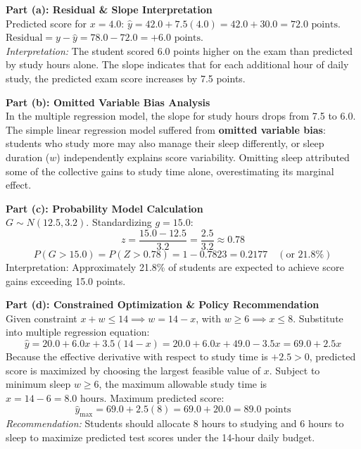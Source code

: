 \begin{frqrubricbox}
\textbf{Part (a): Residual \& Slope Interpretation}\\
Predicted score for $x = 4.0$: $\hat{y} = 42.0 + 7.5(4.0) = 42.0 + 30.0 = 72.0\text{ points}$.\\
$\text{Residual} = y - \hat{y} = 78.0 - 72.0 = +6.0\text{ points}$.\\
\textit{Interpretation:} The student scored 6.0 points higher on the exam than predicted by study hours alone. The slope indicates that for each additional hour of daily study, the predicted exam score increases by 7.5 points.

\textbf{Part (b): Omitted Variable Bias Analysis}\\
In the multiple regression model, the slope for study hours drops from 7.5 to 6.0. The simple linear regression model suffered from \textbf{omitted variable bias}: students who study more may also manage their sleep differently, or sleep duration ($w$) independently explains score variability. Omitting sleep attributed some of the collective gains to study time alone, overestimating its marginal effect.

\textbf{Part (c): Probability Model Calculation}\\
$G \sim N(12.5, 3.2)$. Standardizing $g = 15.0$:
\[ z = \frac{15.0 - 12.5}{3.2} = \frac{2.5}{3.2} \approx 0.78 \]
\[ P(G > 15.0) = P(Z > 0.78) = 1 - 0.7823 = 0.2177 \quad (\text{or } 21.8\%) \]
Interpretation: Approximately 21.8\% of students are expected to achieve score gains exceeding 15.0 points.

\textbf{Part (d): Constrained Optimization \& Policy Recommendation}\\
Given constraint $x + w \le 14 \implies w = 14 - x$, with $w \ge 6 \implies x \le 8$.
Substitute into multiple regression equation:
\[ \hat{y} = 20.0 + 6.0x + 3.5(14 - x) = 20.0 + 6.0x + 49.0 - 3.5x = 69.0 + 2.5x \]
Because the effective derivative with respect to study time is $+2.5 > 0$, predicted score is maximized by choosing the largest feasible value of $x$. Subject to minimum sleep $w \ge 6$, the maximum allowable study time is $x = 14 - 6 = 8.0\text{ hours}$.
Maximum predicted score:
\[ \hat{y}_{\max} = 69.0 + 2.5(8) = 69.0 + 20.0 = 89.0\text{ points} \]
\textit{Recommendation:} Students should allocate 8 hours to studying and 6 hours to sleep to maximize predicted test scores under the 14-hour daily budget.


\end{frqrubricbox}
